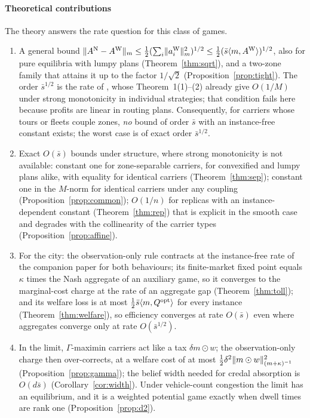 \documentclass[preprint,11pt,authoryear]{elsarticle}
\theoremstyle{plain}
\theoremstyle{remark}
\begin{document}
\paragraph{Theoretical contributions} The theory answers the rate question for this class of games.
\begin{enumerate}
\item A general bound $\lVert A^{\mathrm{N}}-A^{\mathrm{W}}\rVert_m\le\tfrac12(\sum_i\lVert a_i^{\mathrm{W}}\rVert_m^2)^{1/2}\le\tfrac12(\bar s\langle m,A^{\mathrm{W}}\rangle)^{1/2}$, also for pure equilibria with lumpy plans (Theorem~\ref{thm:sqrt}), and a two-zone family that attains it up to the factor $1/\sqrt2$ (Proposition~\ref{prop:tight}). The order $\bar s^{1/2}$ is the rate of \citet[Thm.~1(3)]{Paccagnan2019}, whose Theorem~1(1)--(2) already give $O(1/M)$ under strong monotonicity in individual strategies; that condition fails here because profits are linear in routing plans. Consequently, for carriers whose tours or fleets couple zones, \emph{no} bound of order $\bar s$ with an instance-free constant exists; the worst case is of exact order $\bar s^{1/2}$.
\item Exact $O(\bar s)$ bounds under structure, where strong monotonicity is not available: constant one for zone-separable carriers, for convexified and lumpy plans alike, with equality for identical carriers (Theorem~\ref{thm:sep}); constant one in the $M$-norm for identical carriers under any coupling (Proposition~\ref{prop:common}); $O(1/n)$ for replicas with an instance-dependent constant (Theorem~\ref{thm:rep}) that is explicit in the smooth case and degrades with the collinearity of the carrier types (Proposition~\ref{prop:affine}).
\item For the city: the observation-only rule contracts at the instance-free rate of the companion paper for both behaviours; its finite-market fixed point equals $\kappa$ times the Nash aggregate of an auxiliary game, so it converges to the marginal-cost charge at the rate of an aggregate gap (Theorem~\ref{thm:toll}); and its welfare loss is at most $\tfrac12\bar s\langle m,Q^{\mathrm{opt}}\rangle$ for every instance (Theorem~\ref{thm:welfare}), so efficiency converges at rate $O(\bar s)$ even where aggregates converge only at rate $O(\bar s^{1/2})$.
\item In the limit, $\Gamma$-maximin carriers act like a tax $\delta m\odot w$; the observation-only charge then over-corrects, at a welfare cost of at most $\tfrac12\delta^2\lVert m\odot w\rVert^2_{(m+\kappa)^{-1}}$ (Proposition~\ref{prop:gamma}); the belief width needed for credal absorption is $O(d\bar s)$ (Corollary~\ref{cor:width}). Under vehicle-count congestion the limit has an equilibrium, and it is a weighted potential game exactly when dwell times are rank one (Proposition~\ref{prop:d2}).

\end{enumerate}
\end{document}
